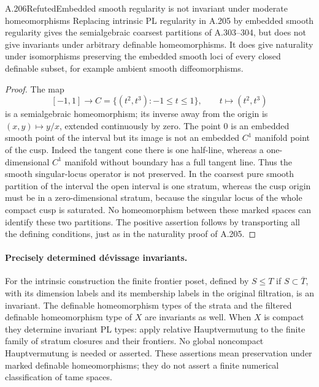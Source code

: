 \begin{saresult}{A.206}{Refuted}{Embedded smooth regularity is not invariant under moderate homeomorphisms}
Replacing intrinsic PL regularity in A.205 by embedded smooth
regularity gives the semialgebraic coarsest partitions of A.303--304,
but does not give invariants under arbitrary definable homeomorphisms.
It does give naturality under isomorphisms preserving the embedded
smooth loci of every closed definable subset, for example ambient
smooth diffeomorphisms.
\end{saresult}
\begin{proof}
The map
\[
 [-1,1]\longrightarrow C=\{(t^2,t^3):-1\le t\le1\},
 \qquad t\longmapsto(t^2,t^3)
\]
is a semialgebraic homeomorphism; its inverse away from the origin
is $(x,y)\mapsto y/x$, extended continuously by zero. The point
$0$ is an embedded smooth point of the interval but its image is
not an embedded $C^1$ manifold point of the cusp. Indeed the tangent
cone there is one half-line, whereas a one-dimensional $C^1$
manifold without boundary has a full tangent line. Thus the smooth
singular-locus operator is not preserved. In the coarsest pure smooth
partition of the interval the open interval is one stratum, whereas
the cusp origin must be in a zero-dimensional stratum, because
the singular locus of the whole compact cusp is saturated. No
homeomorphism between these marked spaces can identify these two
partitions. The positive assertion follows by transporting all
the defining conditions, just as in the naturality proof of A.205.
\end{proof}

\paragraph{Precisely determined d\'evissage invariants.}
For the intrinsic construction the finite frontier poset, defined by
$S\le T$ if $S\subset\overline T$, with its dimension labels and
its membership labels in the original filtration, is an invariant.
The definable homeomorphism types of the strata and the filtered
definable homeomorphism type of $X$ are invariants as well. When
$X$ is compact they determine invariant PL types: apply relative
Hauptvermutung to the finite family of stratum closures and their
frontiers. No global noncompact Hauptvermutung is needed or asserted.
These assertions
mean preservation under marked definable homeomorphisms; they do
not assert a finite numerical classification of tame spaces.


